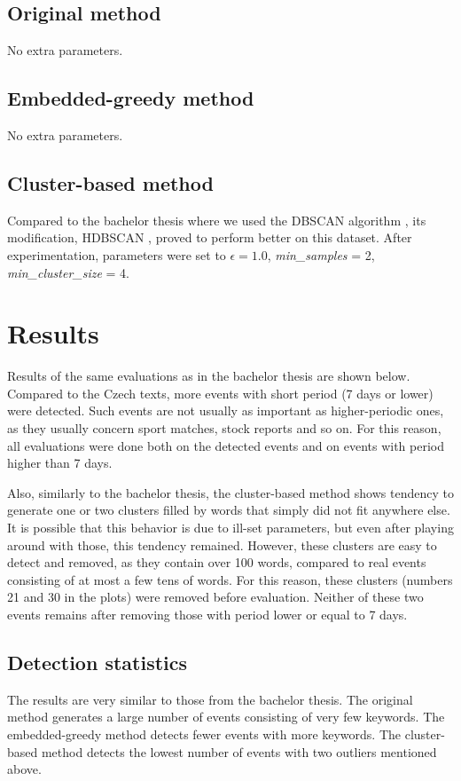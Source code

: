 \documentclass[a4paper]{article}
\begin{document}
\subsection{Original method}
No extra parameters.

\subsection{Embedded-greedy method}
No extra parameters.

\subsection{Cluster-based method}
Compared to the bachelor thesis where we used the DBSCAN algorithm \cite{dbscan}, its modification, HDBSCAN \cite{hdbscan}, proved to perform better on this dataset. After experimentation, parameters were set to $\epsilon = 1.0$, \textit{min\_samples} = 2, \textit{min\_cluster\_size} = 4.


\section{Results}
Results of the same evaluations as in the bachelor thesis are shown below. Compared to the Czech texts, more events with short period (7 days or lower) were detected. Such events are not usually as important as higher-periodic ones, as they usually concern sport matches, stock reports and so on. For this reason, all evaluations were done both on the detected events and on events with period higher than 7 days.

Also, similarly to the bachelor thesis, the cluster-based method shows tendency to generate one or two clusters filled by words that simply did not fit anywhere else. It is possible that this behavior is due to ill-set parameters, but even after playing around with those, this tendency remained. However, these clusters are easy to detect and removed, as they contain over 100 words, compared to real events consisting of at most a few tens of words. For this reason, these clusters (numbers 21 and 30 in the plots) were removed before evaluation. Neither of these two events remains after removing those with period lower or equal to 7 days.

\subsection{Detection statistics}
The results are very similar to those from the bachelor thesis. The original method generates a large number of events consisting of very few keywords. The embedded-greedy method detects fewer events with more keywords. The cluster-based method detects the lowest number of events with two outliers mentioned above.
\end{document}
